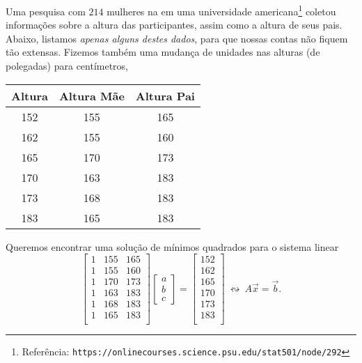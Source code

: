 \documentclass[../livro.tex]{subfiles}  %
\begin{document}
\begin{example}
  Uma pesquisa com $214$ mulheres na em uma universidade americana\footnote{Referência: \verb"https://onlinecourses.science.psu.edu/stat501/node/292"} coletou informações sobre a altura das participantes, assim como a altura de seus pais. Abaixo, listamos \textit{apenas alguns destes dados}, para que nossas contas não fiquem tão extensas. Fizemos também uma mudança de unidades nas alturas (de polegadas) para centímetros,
  \begin{center}
    \begin{tabular}{|c|c|c|}
      \hline
      Altura & Altura Mãe & Altura Pai \\ \hline
      152 & 155 & 165 \\
      162 & 155 & 160 \\
      165 & 170 & 173 \\
      170 & 163 & 183 \\
      173 & 168 & 183 \\
      183 & 165 & 183 \\
      \hline
    \end{tabular}
  \end{center} Queremos encontrar uma solução de mínimos quadrados para o sistema linear
  \begin{equation}
  \begin{bmatrix}
    1 & 155 & 165 \\
    1 & 155 & 160 \\
    1 & 170 & 173 \\
    1 & 163 & 183 \\
    1 & 168 & 183 \\
    1 & 165 & 183 \\
  \end{bmatrix}
  \begin{bmatrix}
    a \\ b \\ c
  \end{bmatrix} =
  \begin{bmatrix}
    152  \\
    162  \\
    165  \\
    170  \\
    173  \\
    183  \\
  \end{bmatrix} \ \leftrightsquigarrow \ A \vec{x} = \vec{b}.

\end{equation}
\end{example}
\end{document}

